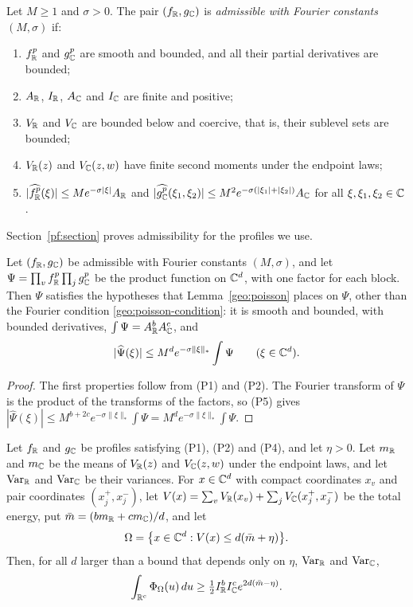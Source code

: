 \begin{definition}\label{geo:admissible}
Let $M\ge1$ and $\sigma>0$. The pair $(f_\mathbb R,g_\mathbb C)$ is \emph{admissible
with Fourier constants $(M,\sigma)$} if:
\begin{enumerate}
\item[(P1)] $f_\mathbb R^p$ and $g_\mathbb C^p$ are smooth and bounded, and all their
partial derivatives are bounded;
\item[(P2)] $A_\mathbb R$, $I_\mathbb R$, $A_\mathbb C$ and $I_\mathbb C$ are finite and positive;
\item[(P3)] $V_\mathbb R$ and $V_\mathbb C$ are bounded below and coercive, that is,
their sublevel sets are bounded;
\item[(P4)] $V_\mathbb R(z)$ and $V_\mathbb C(z,w)$ have finite second moments under
the endpoint laws;
\item[(P5)] $|\widehat{f_\mathbb R^p}(\xi)|\le Me^{-\sigma|\xi|}A_\mathbb R$ and
$|\widehat{g_\mathbb C^p}(\xi_1,\xi_2)|\le M^2e^{-\sigma(|\xi_1|+|\xi_2|)}A_\mathbb C$
for all $\xi,\xi_1,\xi_2\in\mathbb C$.
\end{enumerate}
\end{definition}

Section~\ref{pf:section} proves admissibility for the profiles we use.

\begin{lemma}\label{geo:tensor}
Let $(f_\mathbb R,g_\mathbb C)$ be admissible with Fourier constants $(M,\sigma)$, and
let $\Psi=\prod_vf_\mathbb R^p\prod_jg_\mathbb C^p$ be the product function on $\mathbb C^d$,
with one factor for each block. Then $\Psi$ satisfies the hypotheses that
Lemma~\ref{geo:poisson} places on $\Psi$, other than the Fourier condition
\eqref{geo:poisson-condition}: it is smooth and bounded, with bounded
derivatives, $\int\Psi=A_\mathbb R^bA_\mathbb C^c$, and
\[
 |\widehat\Psi(\xi)|\le M^de^{-\sigma\|\xi\|_*}\int\Psi\qquad(\xi\in\mathbb C^d).
\]
\end{lemma}

\begin{proof}
The first properties follow from (P1) and (P2). The Fourier transform of
$\Psi$ is the product of the transforms of the factors, so (P5) gives
$|\widehat\Psi(\xi)|\le M^{b+2c}e^{-\sigma\|\xi\|_*}\int\Psi
=M^de^{-\sigma\|\xi\|_*}\int\Psi$.
\end{proof}

\begin{lemma}\label{geo:concentration}
Let $f_\mathbb R$ and $g_\mathbb C$ be profiles satisfying (P1), (P2) and (P4), and let
$\eta>0$. Let $m_\mathbb R$ and $m_\mathbb C$ be the means of $V_\mathbb R(z)$ and $V_\mathbb C(z,w)$
under the endpoint laws, and let $\mathrm{Var}_\mathbb R$ and $\mathrm{Var}_\mathbb C$ be
their variances. For $x\in\mathbb C^d$ with compact coordinates $x_v$ and pair
coordinates $(x_j^+,x_j^-)$, let
$V(x)=\sum_vV_\mathbb R(x_v)+\sum_jV_\mathbb C(x_j^+,x_j^-)$ be the total energy, put
$\bar m=(bm_\mathbb R+cm_\mathbb C)/d$, and let
\[
 \Omega=\bigl\{x\in\mathbb C^d:V(x)\le d(\bar m+\eta)\bigr\}.
\]
Then, for all $d$ larger than a bound that depends only on $\eta$,
$\mathrm{Var}_\mathbb R$ and $\mathrm{Var}_\mathbb C$,
\[
 \int_{\mathbb R^c}\Phi_\Omega(u)\,du\ge\tfrac12I_\mathbb R^bI_\mathbb C^ce^{2d(\bar m-\eta)}.
\]
\end{lemma}

